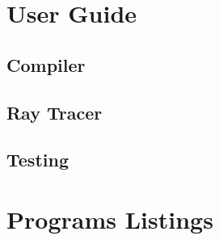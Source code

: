\documentclass[11pt]{report}
\begin{document}
\begin{appendices}

\chapter{User Guide}
\section{Compiler}
\section{Ray Tracer}
\section{Testing}

\chapter{Programs Listings}

\end{appendices}
\end{document}
